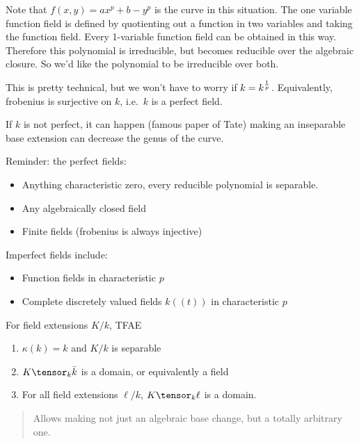 Note that \(f(x, y) = ax^p + b - y^p\) is the curve in this situation.
The one variable function field is defined by quotienting out a function
in two variables and taking the function field. Every 1-variable
function field can be obtained in this way. Therefore this polynomial is
irreducible, but becomes reducible over the algebraic closure. So we'd
like the polynomial to be irreducible over both.

\begin{remark}

This is pretty technical, but we won't have to worry if
\(k = k^{1\over p}\). Equivalently, frobenius is surjective on \(k\),
i.e.~\(k\) is a perfect field.

If \(k\) is not perfect, it can happen (famous paper of Tate) making an
inseparable base extension can decrease the genus of the curve.

\end{remark}

Reminder: the perfect fields:

\begin{itemize}
\tightlist
\item
  Anything characteristic zero, every reducible polynomial is separable.
\item
  Any algebraically closed field
\item
  Finite fields (frobenius is always injective)
\end{itemize}

Imperfect fields include:

\begin{itemize}
\tightlist
\item
  Function fields in characteristic \(p\)
\item
  Complete discretely valued fields \(k((t))\) in characteristic \(p\)
\end{itemize}


\begin{theorem}[FT 12.20]

For field extensions \(K/k\), TFAE

\begin{enumerate}
\def\labelenumi{\arabic{enumi}.}
\item
  \(\kappa(k) = k\) and \(K/k\) is separable
\item
  \(K\tensor_k \bar k\) is a domain, or equivalently a field
\item
  For all field extensions \(\ell/k\), \(K\tensor_k \ell\) is a domain.
\end{enumerate}

\begin{quote}
Allows making not just an algebraic base change, but a totally arbitrary
one.
\end{quote}

\end{theorem}

